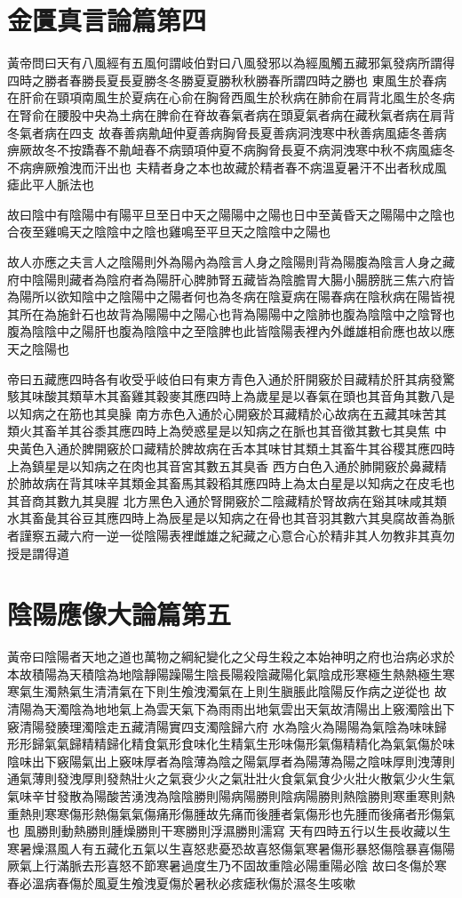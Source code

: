 \section{金匱真言論篇第四}

黃帝問曰天有八風經有五風何謂岐伯對曰八風發邪以為經風觸五藏邪氣發病所謂得四時之勝者春勝長夏長夏勝冬冬勝夏夏勝秋秋勝春所謂四時之勝也
東風生於春病在肝俞在頸項南風生於夏病在心俞在胸脅西風生於秋病在肺俞在肩背北風生於冬病在腎俞在腰股中央為土病在脾俞在脊故春氣者病在頭夏氣者病在藏秋氣者病在肩背冬氣者病在四支
故春善病鼽衄仲夏善病胸脅長夏善病洞洩寒中秋善病風瘧冬善病痹厥故冬不按蹻春不鼽衄春不病頸項仲夏不病胸脅長夏不病洞洩寒中秋不病風瘧冬不病痹厥飧洩而汗出也
夫精者身之本也故藏於精者春不病溫夏暑汗不出者秋成風瘧此平人脈法也

故曰陰中有陰陽中有陽平旦至日中天之陽陽中之陽也日中至黃昏天之陽陽中之陰也合夜至雞鳴天之陰陰中之陰也雞鳴至平旦天之陰陰中之陽也

故人亦應之夫言人之陰陽則外為陽內為陰言人身之陰陽則背為陽腹為陰言人身之藏府中陰陽則藏者為陰府者為陽肝心脾肺腎五藏皆為陰膽胃大腸小腸膀胱三焦六府皆為陽所以欲知陰中之陰陽中之陽者何也為冬病在陰夏病在陽春病在陰秋病在陽皆視其所在為施針石也故背為陽陽中之陽心也背為陽陽中之陰肺也腹為陰陰中之陰腎也腹為陰陰中之陽肝也腹為陰陰中之至陰脾也此皆陰陽表裡內外雌雄相俞應也故以應天之陰陽也

帝曰五藏應四時各有收受乎岐伯曰有東方青色入通於肝開竅於目藏精於肝其病發驚駭其味酸其類草木其畜雞其穀麥其應四時上為歲星是以春氣在頭也其音角其數八是以知病之在筋也其臭臊
南方赤色入通於心開竅於耳藏精於心故病在五藏其味苦其類火其畜羊其谷黍其應四時上為熒惑星是以知病之在脈也其音徵其數七其臭焦
中央黃色入通於脾開竅於口藏精於脾故病在舌本其味甘其類土其畜牛其谷稷其應四時上為鎮星是以知病之在肉也其音宮其數五其臭香
西方白色入通於肺開竅於鼻藏精於肺故病在背其味辛其類金其畜馬其穀稻其應四時上為太白星是以知病之在皮毛也其音商其數九其臭腥
北方黑色入通於腎開竅於二陰藏精於腎故病在谿其味咸其類水其畜彘其谷豆其應四時上為辰星是以知病之在骨也其音羽其數六其臭腐故善為脈者謹察五藏六府一逆一從陰陽表裡雌雄之紀藏之心意合心於精非其人勿教非其真勿授是謂得道


\section{陰陽應像大論篇第五}

黃帝曰陰陽者天地之道也萬物之綱紀變化之父母生殺之本始神明之府也治病必求於本故積陽為天積陰為地陰靜陽躁陽生陰長陽殺陰藏陽化氣陰成形寒極生熱熱極生寒寒氣生濁熱氣生清清氣在下則生飧洩濁氣在上則生䐜脹此陰陽反作病之逆從也
故清陽為天濁陰為地地氣上為雲天氣下為雨雨出地氣雲出天氣故清陽出上竅濁陰出下竅清陽發腠理濁陰走五藏清陽實四支濁陰歸六府
水為陰火為陽陽為氣陰為味味歸形形歸氣氣歸精精歸化精食氣形食味化生精氣生形味傷形氣傷精精化為氣氣傷於味
陰味出下竅陽氣出上竅味厚者為陰薄為陰之陽氣厚者為陽薄為陽之陰味厚則洩薄則通氣薄則發洩厚則發熱壯火之氣衰少火之氣壯壯火食氣氣食少火壯火散氣少火生氣
氣味辛甘發散為陽酸苦湧洩為陰陰勝則陽病陽勝則陰病陽勝則熱陰勝則寒重寒則熱重熱則寒寒傷形熱傷氣氣傷痛形傷腫故先痛而後腫者氣傷形也先腫而後痛者形傷氣也
風勝則動熱勝則腫燥勝則干寒勝則浮濕勝則濡寫
天有四時五行以生長收藏以生寒暑燥濕風人有五藏化五氣以生喜怒悲憂恐故喜怒傷氣寒暑傷形暴怒傷陰暴喜傷陽厥氣上行滿脈去形喜怒不節寒暑過度生乃不固故重陰必陽重陽必陰
故曰冬傷於寒春必溫病春傷於風夏生飧洩夏傷於暑秋必痎瘧秋傷於濕冬生咳嗽

